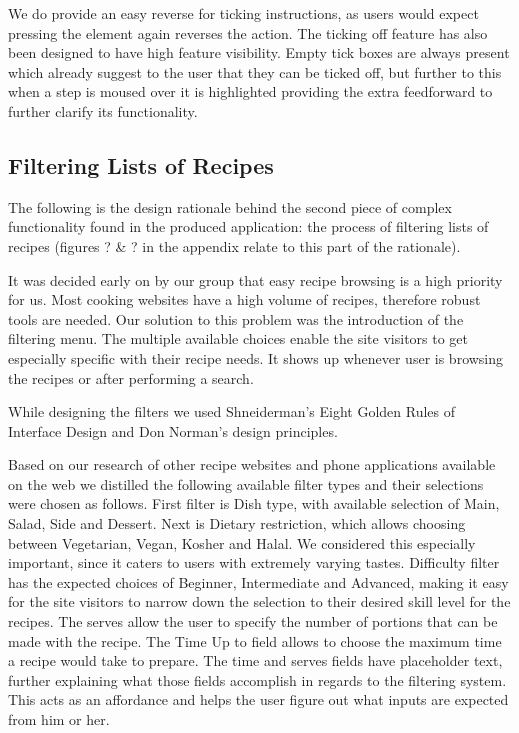 We do provide an easy reverse for ticking instructions, as users would expect pressing the element again reverses the action. The ticking off feature has also been designed to have high feature visibility. Empty tick boxes are always present which already suggest to the user that they can be ticked off, but further to this when a step is moused over it is highlighted providing the extra feedforward to further clarify its functionality.

\subsection{Filtering Lists of Recipes}
The following is the design rationale behind the second piece of complex functionality found in the produced application: the process of filtering lists of recipes (figures ? \& ? in the appendix relate to this part of the rationale).

It was decided early on by our group that easy recipe browsing is a high priority for us. Most cooking websites have a high volume of recipes, therefore robust tools are needed. Our solution to this problem was the introduction of the filtering menu. The multiple available choices enable the site visitors to get especially specific with their recipe needs. It shows up whenever user is browsing the recipes or after performing a search.

While designing the filters we used Shneiderman’s Eight Golden Rules of Interface Design and Don Norman’s design principles.

Based on our research of other recipe websites and phone applications available on the web  we distilled the following available filter types and their selections were chosen as follows. First filter is Dish type, with available selection of Main, Salad, Side and Dessert. Next is Dietary restriction, which allows choosing between Vegetarian, Vegan, Kosher and Halal. We considered this especially important, since it caters to users with extremely varying tastes. Difficulty filter has the expected choices of Beginner, Intermediate and Advanced, making it easy for the site visitors to narrow down the selection to their desired skill level for the recipes. The serves allow the user to specify the number of portions that can be made with the recipe. The Time Up to field allows to choose the maximum time a recipe would take to prepare. The time and serves fields have placeholder text, further explaining what those fields accomplish in regards to the filtering system. This acts as an affordance and helps the user figure out what inputs are expected from him or her.

